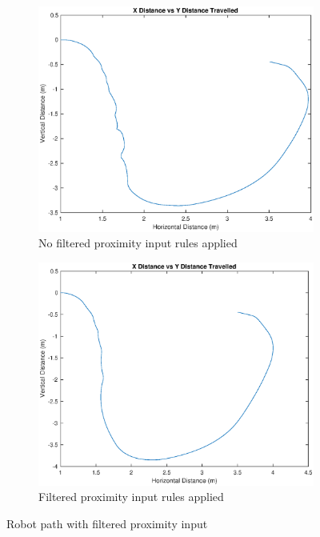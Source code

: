 \documentclass[10pt]{article}
\begin{document}
\begin{figure}[H]
    \centering
    \begin{subfigure}{.5\textwidth}
      \centering
      \includegraphics[scale=0.4]{./figures/SharpTurn_noFilt.eps}
      \caption{No filtered proximity input rules applied}
      \label{fig:filtSub1}
    \end{subfigure}%
    \begin{subfigure}{.5\textwidth}
      \centering
      \includegraphics[scale=0.4]{./figures/SharpTurn_withFilt.eps}
      \caption{Filtered proximity input rules applied}
      \label{fig:filtSub2}
    \end{subfigure}
    \caption{Robot path with filtered proximity input}
    \label{fig:wallFilter}
    \end{figure}
\end{document}

